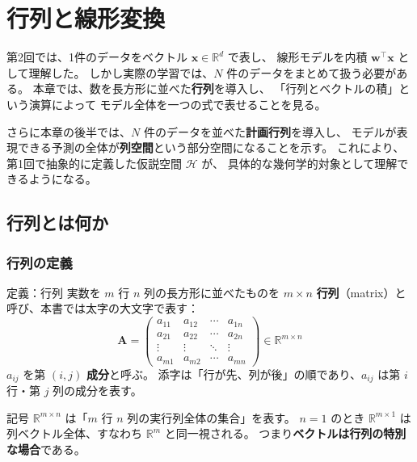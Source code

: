 \pagebreak

\section{行列と線形変換}

第2回では、1件のデータをベクトル $\bm{x} \in \mathbb{R}^d$ で表し、
線形モデルを内積 $\bm{w}^\top \bm{x}$ として理解した。
しかし実際の学習では、$N$ 件のデータをまとめて扱う必要がある。
本章では、数を長方形に並べた\textbf{行列}を導入し、
「行列とベクトルの積」という演算によって
モデル全体を一つの式で表せることを見る。

さらに本章の後半では、$N$ 件のデータを並べた\textbf{計画行列}を導入し、
モデルが表現できる予測の全体が\textbf{列空間}という部分空間になることを示す。
これにより、第1回で抽象的に定義した仮説空間 $\mathcal{H}$ が、
具体的な幾何学的対象として理解できるようになる。


\subsection{行列とは何か}

\subsubsection{行列の定義}

\begin{itembox}[l]{定義：行列}
実数を $m$ 行 $n$ 列の長方形に並べたものを
$m \times n$ \textbf{行列}（matrix）と呼び、本書では太字の大文字で表す：
\begin{equation}
  \bm{A} =
  \begin{pmatrix}
    a_{11} & a_{12} & \cdots & a_{1n} \\
    a_{21} & a_{22} & \cdots & a_{2n} \\
    \vdots & \vdots & \ddots & \vdots \\
    a_{m1} & a_{m2} & \cdots & a_{mn}
  \end{pmatrix}
  \in \mathbb{R}^{m \times n}
\end{equation}
$a_{ij}$ を第 $(i, j)$ \textbf{成分}と呼ぶ。
添字は「行が先、列が後」の順であり、$a_{ij}$ は第 $i$ 行・第 $j$ 列の成分を表す。
\end{itembox}

記号 $\mathbb{R}^{m \times n}$ は「$m$ 行 $n$ 列の実行列全体の集合」を表す。
$n = 1$ のとき $\mathbb{R}^{m \times 1}$ は列ベクトル全体、すなわち $\mathbb{R}^m$ と同一視される。
つまり\textbf{ベクトルは行列の特別な場合}である。

